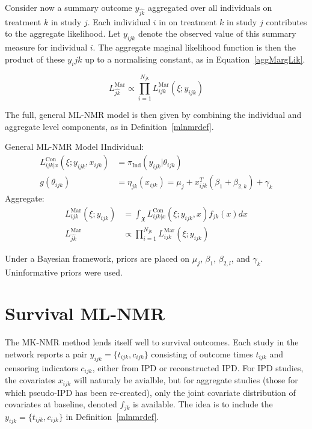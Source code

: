 Consider now a summary outcome $y_{\hat{jk}}$ aggregated over all individuals on treatment $k$ in study $j$. Each individual $i$ in on treatment $k$ in study $j$ contributes to the aggregate likelihood. Let $y_{ijk}$ denote the observed value of this summary measure for individual $i$. The aggregate maginal likelihood function is then the product of these $y_ijk$ up to a normalising constant, as in Equation~\ref{aggMargLik}.

\begin{equation}
    L_{\hat{jk}}^{\text{Mar}} \propto \prod_{i = 1}^{N_{jk}}L_{ijk}^{\text{Mar}}(\xi; y_{ijk})
    \label{aggMargLik}
\end{equation}

The full, general ML-NMR model is then given by combining the individual and aggregate level components, as in Definition~\ref{mlnmrdef}.

\begin{definition}{General ML-NMR Model}
    IIndividual:
    \begin{align}
        L_{ijk|x}^{\text{Con}}(\xi;y_{ijk},x_{ijk}) &= \pi_{\text{Ind}}(y_{ijk}|\theta_{ijk}) \\
        g(\theta_{ijk}) &= \eta_{jk}(x_{ijk}) = \mu_j + x_{ijk}^T(\beta_1 + \beta_{2,k}) + \gamma_k \label{mlnmragg}
    \end{align}
    Aggregate:
    \begin{align}
        L_{ijk}^{\text{Mar}}(\xi; y_{ijk}) &= \int_{\mathfrak{X}} L_{ijk|x}^{\text{Con}}(\xi; y_{ijk}, x)f_{jk}(x)dx \label{mlnnmrint}\\
        L_{\hat{jk}}^{\text{Mar}} &\propto \prod_{i = 1}^{N_{jk}}L_{ijk}^{\text{Mar}}(\xi; y_{ijk})
    \end{align}
    \label{mlnmrdef}
\end{definition}

Under a Bayesian framework, priors are placed on $\mu_j$, $\beta_1$, $\beta_{2,l}$, and $\gamma_k$. Uninformative priors were used.

\section{Survival ML-NMR}
The MK-NMR method lends itself well to survival outcomes. Each study in the network reports a pair $y_{ijk} = \{t_{ijk}, c_{ijk}\}$ consisting of outcome times $t_{ijk}$ and censoring indicators $c_{ijk}$, either from IPD or reconstructed IPD. For IPD studies, the covariates $x_{ijk}$ will naturaly be avialble, but for aggregate studies (those for which pseudo-IPD has been re-created), only the joint covariate distribution of covariates at baseline, denoted $f_{jk}$ is available. The idea is to include the $y_{ijk} = \{t_{ijk}, c_{ijk}\}$ in Definition~\ref{mlnmrdef}. \\

